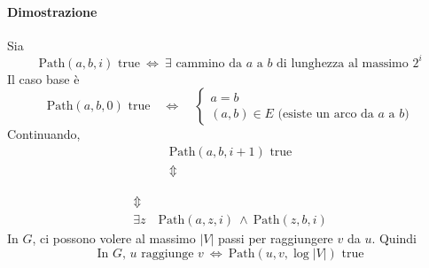 \paragraph{Dimostrazione} Sia
$$
    \text{Path}(a,b,i) \text{ true}
    ~\Leftrightarrow~
    \exists \text{ cammino da } a \text{ a } b \text{ di lunghezza al massimo } 2^i
$$
Il caso base è 
$$
    \text{Path}(a,b,0) \text{ true}
    \quad\Leftrightarrow\quad
    \begin{cases*}
        a=b\\
        (a,b)\in E \text{ (esiste un arco da } a \text{ a } b)
    \end{cases*}
$$
Continuando,
\begin{eqnarray*}
    &\text{Path}(a,b,i+1) \text{ true}&\\
    &\Updownarrow&
\end{eqnarray*}
\begin{center}
\end{center}
\begin{eqnarray*}
    &\Updownarrow&\\
    &\exists z \quad \text{Path}(a,z,i) ~\land~ \text{Path}(z,b,i)&
\end{eqnarray*}
In $G$, ci possono volere al massimo $|V|$ passi per raggiungere $v$ da $u$. Quindi
$$
    \text{In } G \text{, } u \text{ raggiunge } v
    ~\Leftrightarrow~
    \text{Path}(u,v,\log|V|) \text{ true}
$$
